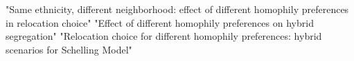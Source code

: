 "Same ethnicity, different neighborhood: effect of different homophily preferences in relocation choice"
"Effect of different homophily preferences on hybrid segregation"
"Relocation choice for different homophily preferences: hybrid scenarios for Schelling Model"
